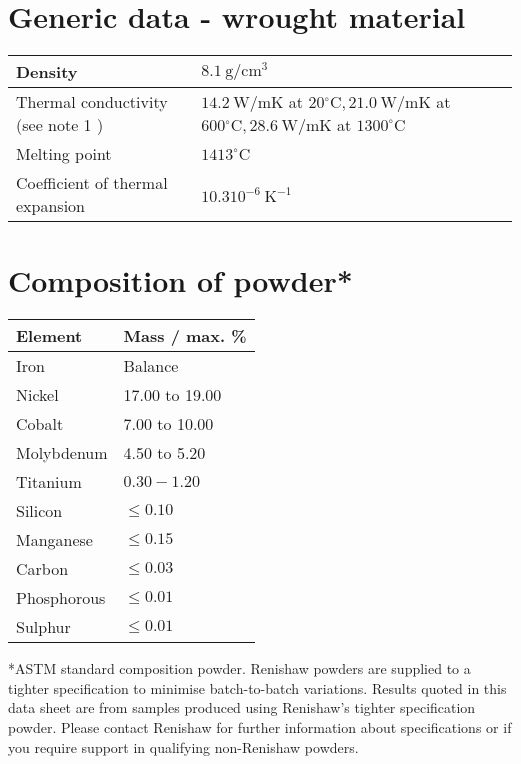 \documentclass[10pt]{article}
\begin{document}
\section*{Generic data - wrought material}
\begin{center}
\begin{tabular}{|l|l|}
\hline
Density & $8.1 \mathrm{~g} / \mathrm{cm}^{3}$ \\
\hline
Thermal conductivity (see note 1 ) & $14.2 \mathrm{~W} / \mathrm{mK}$ at $20{ }^{\circ} \mathrm{C}, 21.0 \mathrm{~W} / \mathrm{mK}$ at $600{ }^{\circ} \mathrm{C}, 28.6 \mathrm{~W} / \mathrm{mK}$ at $1300^{\circ} \mathrm{C}$ \\
\hline
Melting point & $1413^{\circ} \mathrm{C}$ \\
\hline
Coefficient of thermal expansion & $10.310^{-6} \mathrm{~K}^{-1}$ \\
\hline
\end{tabular}
\end{center}

\section*{Composition of powder*}
\begin{center}
\begin{tabular}{|l|l|}
\hline
Element & Mass / max. \% \\
\hline
Iron & Balance \\
\hline
Nickel & 17.00 to 19.00 \\
\hline
Cobalt & 7.00 to 10.00 \\
\hline
Molybdenum & 4.50 to 5.20 \\
\hline
Titanium & $0.30-1.20$ \\
\hline
Silicon & $\leq 0.10$ \\
\hline
Manganese & $\leq 0.15$ \\
\hline
Carbon & $\leq 0.03$ \\
\hline
Phosphorous & $\leq 0.01$ \\
\hline
Sulphur & $\leq 0.01$ \\
\hline
\end{tabular}
\end{center}

*ASTM standard composition powder. Renishaw powders are supplied to a tighter specification to minimise batch-to-batch variations. Results quoted in this data sheet are from samples produced using Renishaw's tighter specification powder. Please contact Renishaw for further information about specifications or if you require support in qualifying non-Renishaw powders.
\end{document}
